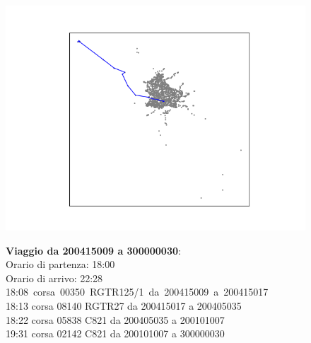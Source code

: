 \documentclass{article}
\begin{document}
\begin{figure}[H]
	\begin{minipage}{0.55\linewidth}
		\centering
		\hspace*{-3cm}\includegraphics[width=1.0\linewidth, valign=t]{figures/200415009_300000030}
	\end{minipage}
	\hspace*{-2cm}\begin{minipage}{0.7\linewidth}
		\textbf{Viaggio da 200415009 a 300000030}:\\
		Orario di partenza: 18:00\\
		Orario di arrivo: 22:28\\
		\mbox{18:08 corsa 00350 RGTR125/1 da 200415009 a 200415017}\\
		18:13 corsa 08140 RGTR27 da 200415017 a 200405035\\
		18:22 corsa 05838 C821 da 200405035 a 200101007\\
		19:31 corsa 02142 C821 da 200101007 a 300000030
		
		
			\end{minipage}
\end{figure}
\end{document}
